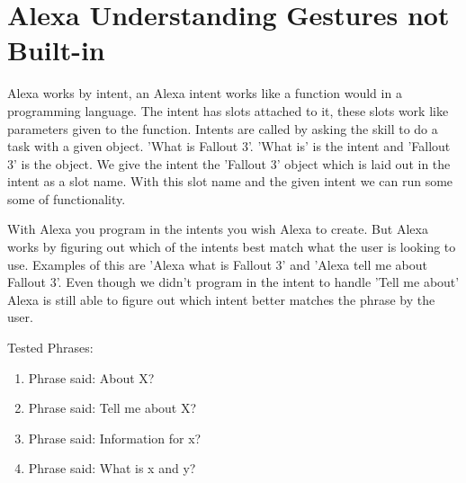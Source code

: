 \section{Alexa Understanding Gestures not Built-in}
Alexa works by intent, an Alexa intent works like a function would in a programming language. The intent has slots attached to it, these slots work like parameters given to the function. Intents are called by asking the skill to do a task with a given object. 'What is Fallout 3'. 'What is' is the intent and 'Fallout 3' is the object. We give the intent the 'Fallout 3' object which is laid out in the intent as a slot name. With this slot name and the given intent we can run some some of functionality.

With Alexa you program in the intents you wish Alexa to create. But Alexa works by figuring out which of the intents best match what the user is looking to use. Examples of this are 'Alexa what is Fallout 3' and 'Alexa tell me about Fallout 3'. Even though we didn't program in the intent to handle 'Tell me about' Alexa is still able to figure out which intent better matches the phrase by the user.

Tested Phrases:
\begin{enumerate}
    \item Phrase said: About X?
    
    \item Phrase said: Tell me about X?
    
    \item Phrase said: Information for x?
    
    \item Phrase said: What is x and y?
\end{enumerate}

